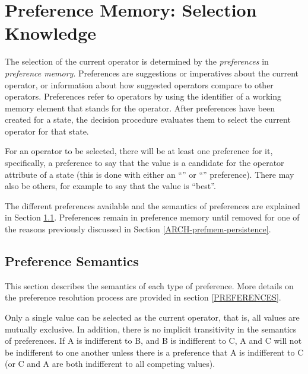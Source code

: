 \section{Preference Memory: Selection Knowledge} 
\label{ARCH-prefmem}


The selection of the current operator is determined by the \emph{preferences} in
\emph{preference memory}. Preferences are suggestions or imperatives about the
current operator, or information about how suggested operators compare
to other operators.  Preferences refer to operators by using the
identifier of a working memory element that stands for the operator.
After preferences have been created for a state, the decision procedure
evaluates them to select the current operator for that state.

For an operator to be selected, there will be at least one preference
for it, specifically, a preference to say that the value is a candidate
for the operator attribute of a state (this is done with either an
``'' or ``'' preference). There may also
be others, for example to say that the value is ``best''.

The different preferences available and the semantics of preferences are
explained in Section \ref{ARCH-prefmem-semantics}. Preferences remain in
preference memory until removed for one of the reasons previously discussed in
Section \ref{ARCH-prefmem-persistence}.

\subsection{Preference Semantics}
\label{ARCH-prefmem-semantics}

This section describes the semantics of each type of preference.  More
details on the preference resolution process are provided in
section \ref{PREFERENCES}.


Only a single value can be selected as the current operator, that is,
all values are mutually exclusive.  In addition, there is no implicit
transitivity in the semantics of preferences.  If A is indifferent to B,
and B is indifferent to C, A and C will not be indifferent to one
another unless there is a preference that A is indifferent to C (or C
and A are both indifferent to all competing values).

